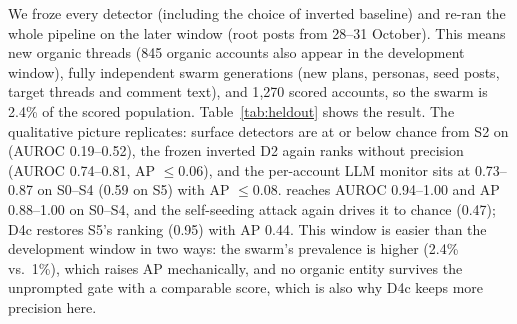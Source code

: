 We froze every detector (including the choice of inverted baseline) and re-ran the whole pipeline on the later window (root posts from 28--31 October). This means new organic threads (845 organic accounts also appear in the development window), fully independent swarm generations (new plans, personas, seed posts, target threads and comment text), and 1{,}270 scored accounts, so the swarm is 2.4\% of the scored population.
Table~\ref{tab:heldout} shows the result. The qualitative picture replicates: surface detectors are at or below chance from S2 on (AUROC 0.19--0.52), the frozen inverted D2 again ranks without precision (AUROC 0.74--0.81, AP $\le 0.06$), and the per-account LLM monitor sits at 0.73--0.87 on S0--S4 (0.59 on S5) with AP $\le 0.08$.
\ours{} reaches AUROC 0.94--1.00 and AP 0.88--1.00 on S0--S4, and the self-seeding attack again drives it to chance (0.47); D4c restores S5's ranking (0.95) with AP 0.44. This window is easier than the development window in two ways: the swarm's prevalence is higher (2.4\% vs.\ 1\%), which raises AP mechanically, and no organic entity survives the unprompted gate with a comparable score, which is also why D4c keeps more precision here.
\begin{table}[h]
\centering\small
\setlength{\tabcolsep}{4pt}
\caption{Held-out window with frozen detectors: AUROC / AP / recall@30, mean of 3 seeds. The swarm is 2.4\% of scored accounts. Here D4b, D4 without $\pi_c$ and the full D4 coincide, because no organic entity survives the unprompted gate with a comparable score, so $T_c$ and $\pi_c$ do not change the ranking.}
\label{tab:heldout}
\end{table}
